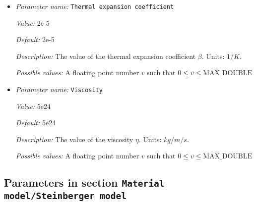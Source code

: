 \begin{itemize}
{\it Value:} 4.7


{\it Default:} 4.7


{\it Description:} The value of the thermal conductivity $k$. Units: $W/m/K$.


{\it Possible values:} A floating point number $v$ such that $0 \leq v \leq \text{MAX\_DOUBLE}$
\item {\it Parameter name:} {\tt Thermal expansion coefficient}
\label{parameters:Material model/Simpler model/Thermal expansion coefficient}


{\it Value:} 2e-5


{\it Default:} 2e-5


{\it Description:} The value of the thermal expansion coefficient $\beta$. Units: $1/K$.


{\it Possible values:} A floating point number $v$ such that $0 \leq v \leq \text{MAX\_DOUBLE}$
\item {\it Parameter name:} {\tt Viscosity}
\label{parameters:Material model/Simpler model/Viscosity}


{\it Value:} 5e24


{\it Default:} 5e24


{\it Description:} The value of the viscosity $\eta$. Units: $kg/m/s$.


{\it Possible values:} A floating point number $v$ such that $0 \leq v \leq \text{MAX\_DOUBLE}$
\end{itemize}

\subsection{Parameters in section \tt Material model/Steinberger model}
\label{parameters:Material_20model/Steinberger_20model}

